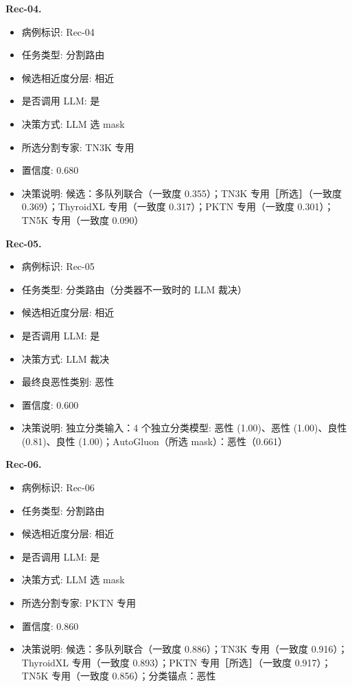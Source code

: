 \noindent\textbf{Rec-04.}\par
\begin{itemize}[leftmargin=1.5em,topsep=0.1em,itemsep=0.05em]
\item 病例标识: Rec-04
\item 任务类型: 分割路由
\item 候选相近度分层: 相近
\item 是否调用 LLM: 是
\item 决策方式: LLM 选 mask
\item 所选分割专家: TN3K 专用
\item 置信度: 0.680
\item 决策说明: 候选：多队列联合（一致度 0.355）；TN3K 专用［所选］（一致度 0.369）；ThyroidXL 专用（一致度 0.317）；PKTN 专用（一致度 0.301）；TN5K 专用（一致度 0.090）
\end{itemize}
\noindent\textbf{Rec-05.}\par
\begin{itemize}[leftmargin=1.5em,topsep=0.1em,itemsep=0.05em]
\item 病例标识: Rec-05
\item 任务类型: 分类路由（分类器不一致时的 LLM 裁决）
\item 候选相近度分层: 相近
\item 是否调用 LLM: 是
\item 决策方式: LLM 裁决
\item 最终良恶性类别: 恶性
\item 置信度: 0.600
\item 决策说明: 独立分类输入：4 个独立分类模型: 恶性 (1.00)、恶性 (1.00)、良性 (0.81)、良性 (1.00)；AutoGluon（所选 mask）：恶性（0.661）
\end{itemize}
\noindent\textbf{Rec-06.}\par
\begin{itemize}[leftmargin=1.5em,topsep=0.1em,itemsep=0.05em]
\item 病例标识: Rec-06
\item 任务类型: 分割路由
\item 候选相近度分层: 相近
\item 是否调用 LLM: 是
\item 决策方式: LLM 选 mask
\item 所选分割专家: PKTN 专用
\item 置信度: 0.860
\item 决策说明: 候选：多队列联合（一致度 0.886）；TN3K 专用（一致度 0.916）；ThyroidXL 专用（一致度 0.893）；PKTN 专用［所选］（一致度 0.917）；TN5K 专用（一致度 0.856）；分类锚点：恶性
\end{itemize}
